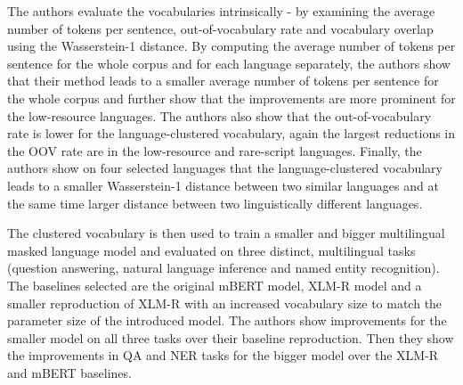 The authors evaluate the vocabularies intrinsically - by examining the average number of tokens per sentence, out-of-vocabulary rate and vocabulary overlap using the Wasserstein-1 distance.
By computing the average number of tokens per sentence for the whole corpus and for each language separately, the authors show that their method leads to a smaller average number of tokens per sentence for the whole corpus and further show that the improvements are more prominent for the low-resource languages. The authors also show that the out-of-vocabulary rate is lower for the language-clustered vocabulary, again the largest reductions in the OOV rate are in the low-resource and rare-script languages. Finally, the authors show on four selected languages that the language-clustered vocabulary leads to a smaller Wasserstein-1 distance between two similar languages and at the same time larger distance between two linguistically different languages.

The clustered vocabulary is then used to train a smaller and bigger multilingual masked language model and evaluated on three distinct, multilingual tasks (question answering, natural language inference and named entity recognition). The baselines selected are the original mBERT model, XLM-R model and a smaller reproduction of XLM-R with an increased vocabulary size to match the parameter size of the introduced model. The authors show improvements for the smaller model on all three tasks over their baseline reproduction. Then they show the improvements in QA and NER tasks for the bigger model over the XLM-R and mBERT baselines. 

